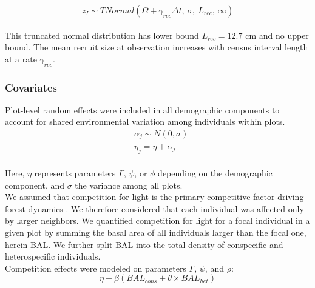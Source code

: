 \begin{equation}
z_{I} \sim TNormal(\Omega + \gamma_{rec} \Delta t,~\sigma, ~ L_{rec}, ~ \infty)
\label{eq:recSize}\end{equation}\\

This truncated normal distribution has lower bound \(L_{rec}=12.7\) cm
and no upper bound. The mean recruit size at observation increases with
census interval length at a rate \(\gamma_{rec}\).\\

\hypertarget{covariates}{%
\subsubsection{Covariates}\label{covariates}}

Plot-level random effects were included in all demographic components to
account for shared environmental variation among individuals within
plots.\\

\begin{equation}
\begin{split}
&\alpha_j \sim N(0, \sigma) \\[2pt]
&\eta_j = \bar{\eta} + \alpha_j
\end{split}
\label{eq:randomEffect}\end{equation}\\

Here, \(\eta\) represents parameters \(\Gamma\), \(\psi\), or \(\phi\)
depending on the demographic component, and \(\sigma\) the variance
among all plots.\\

We assumed that competition for light is the primary competitive factor
driving forest dynamics \citep{Pacala1996a}. We therefore considered
that each individual was affected only by larger neighbors. We
quantified competition for light for a focal individual in a given plot
by summing the basal area of all individuals larger than the focal one,
herein BAL. We further split BAL into the total density of conspecific
and heterospecific individuals.\\

Competition effects were modeled on parameters \(\Gamma\), \(\psi\), and
\(\rho\):\\

\begin{equation}
\eta + \beta (BAL_{cons} + \theta \times BAL_{het})
\label{eq:compEffect}\end{equation}\\

